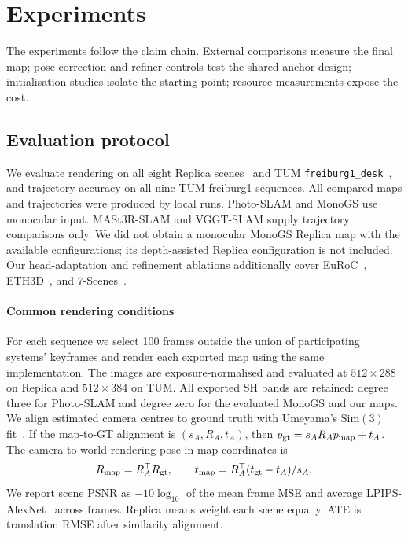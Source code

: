 \section{Experiments}
\label{sec:experiments}
The experiments follow the claim chain. External comparisons measure the final
map; pose-correction and refiner controls test the shared-anchor design;
initialisation studies isolate the starting point; resource measurements expose
the cost.
\subsection{Evaluation protocol}
We evaluate rendering on all eight Replica scenes~\cite{straub2019replica}
and TUM \texttt{freiburg1\_desk}~\cite{sturm2012tum}, and trajectory accuracy
on all nine TUM freiburg1 sequences. All compared maps and trajectories were
produced by local runs. Photo-SLAM and MonoGS use monocular input.
MASt3R-SLAM and VGGT-SLAM supply trajectory comparisons only.
We did not obtain a monocular MonoGS Replica map with the available
configurations; its depth-assisted Replica configuration is not included.
Our head-adaptation and refinement ablations additionally cover
EuRoC~\cite{burri2016euroc}, ETH3D~\cite{schops2017eth3d}, and
7-Scenes~\cite{shotton2013scenecoord}.

\paragraph{Common rendering conditions}
For each sequence we select 100 frames outside the union of participating
systems' keyframes and render each exported map using the same implementation.
The images are exposure-normalised and evaluated at $512{\times}288$
on Replica and $512{\times}384$ on TUM.
All exported SH bands are retained: degree three for Photo-SLAM and degree
zero for the evaluated MonoGS and our maps.
We align estimated camera centres to ground truth with
Umeyama's $\mathrm{Sim}(3)$ fit~\cite{umeyama1991}.
If the map-to-GT alignment is $(s_A,R_A,t_A)$, then
$p_{\rm gt}=s_AR_Ap_{\rm map}+t_A$. The camera-to-world rendering pose in map
coordinates is
\begin{equation}
  R_{\rm map}=R_A^\top R_{\rm gt},\qquad
  t_{\rm map}=R_A^\top(t_{\rm gt}-t_A)/s_A.
  \label{eq:eval}
\end{equation}
We report scene PSNR as $-10\log_{10}$ of the mean frame MSE and average
LPIPS-AlexNet~\cite{zhang2018lpips} across frames. Replica means weight each
scene equally. ATE is translation RMSE after similarity alignment.

